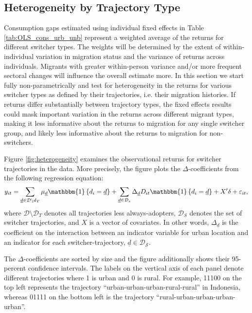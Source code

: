 \documentclass[12pt]{article}
\begin{document}
\subsection{Heterogeneity by Trajectory Type}\label{sec:heterogeneity}

Consumption gaps estimated using individual fixed effects in Table \ref{tab:OLS_cons_urb_unb} represent a weighted average of the returns for different switcher types. 
The weights will be determined by the extent of within-individual variation in migration status and the variance of returns across individuals.
Migrants with greater within-person variance and/or more frequent sectoral changes will influence the overall estimate more.
In this section we start fully non-parametrically and test for heterogeneity in the returns for various switcher types as defined by their trajectories, i.e. their migration histories. 
If returns differ substantially between trajectory types, the fixed effects results could mask important variation in the returns across different migrant types, making it less informative about the returns to migration for any single switcher group, and likely less informative about the returns to migration for non-switchers.

Figure \ref{fig:heterogeneity} examines the observational returns for switcher trajectories in the data. 
More precisely, the figure plots the $\Delta$-coefficients from the following regression equation: 
\begin{equation}
    y_{i t} = \sum_{\underline{d} \in \mathcal{D} \setminus d_{T}} \mu_{\underline{d}} \mathbbm{1} \left\{d_{i}=\underline{d} \right\} + \sum_{\underline{d} \in \mathcal{D}_{s}} \Delta_{\underline{d}} D_{i t} \mathbbm{1} \left\{d_{i}=\underline{d} \right\} + X'\delta +\varepsilon_{i t}, 
\end{equation}
\noindent where $\mathcal{D} \setminus \mathcal{D}_{T}$ denotes all trajectories less always-adopters, $\mathcal{D}_{S}$ denotes the set of switcher trajectories, and $X$ is a vector of covariates. 
In other words, $\Delta_{\underline{d}}$ is the coefficient on the interaction between an indicator variable for urban location and an indicator for each switcher-trajectory, $\underline{d} \in \mathcal{D_{S}}$.

The $\Delta$-coefficients are sorted by size and the figure additionally shows their 95-percent confidence intervals. The labels on the vertical axis of each panel denote different trajectories where 1 is urban and 0 is rural. For example, 11100 on the top left represents the trajectory ``urban-urban-urban-rural-rural'' in Indonesia, whereas 01111 on the bottom left is the trajectory ``rural-urban-urban-urban-urban''. 
\end{document}

